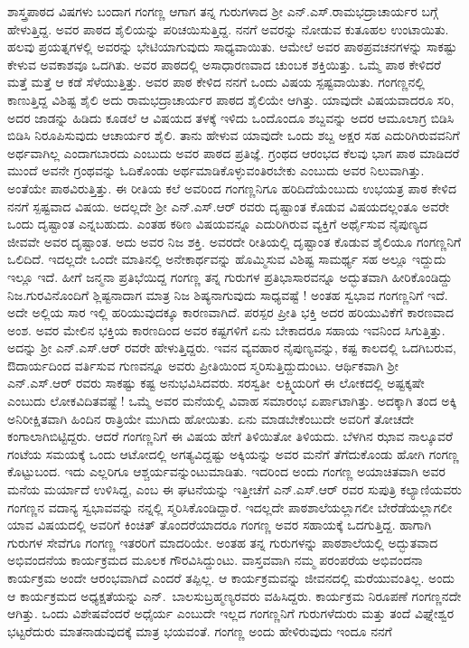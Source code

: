 {ಶಾಸ್ತ್ರಪಾಠದ ವಿಷಗಳು ಬಂದಾಗ ಗಂಗಣ್ಣ ಆಗಾಗ ತನ್ನ ಗುರುಗಳಾದ ಶ್ರೀ ಎನ್.ಎಸ್.ರಾಮಭದ್ರಾಚಾರ್ಯರ ಬಗ್ಗೆ  ಹೇಳುತ್ತಿದ್ದ. ಅವರ ಪಾಠದ \hbox{ಶೈಲಿಯನ್ನು} ಪರಿಚಯಿಸುತ್ತಿದ್ದ. ನನಗೆ ಅವರನ್ನು ನೋಡುವ ಕುತೂಹಲ ಉಂಟಾಯಿತು. ಹಲವು \hbox{ಪ್ರಯತ್ನಗಳಲ್ಲಿ} ಅವರನ್ನು  ಭೇಟಿಯಾಗುವುದು ಸಾಧ್ಯವಾಯಿತು. ಆಮೇಲೆ ಅವರ ಪಾಠಪ್ರವಚನಗಳನ್ನು ಸಾಕಷ್ಟು ಕೇಳುವ ಅವಕಾಶವೂ ಒದಗಿತು. ಅವರ ಪಾಠದಲ್ಲಿ ಅಸಾಧಾರಣವಾದ ಚುಂಬಕ ಶಕ್ತಿಯಿತ್ತು. ಒಮ್ಮೆ ಪಾಠ ಕೇಳಿದರೆ ಮತ್ತೆ ಮತ್ತೆ ಆ ಕಡೆ ಸೆಳೆಯುತ್ತಿತ್ತು. ಅವರ ಪಾಠ ಕೇಳಿದ ನನಗೆ ಒಂದು ವಿಷಯ ಸ್ಪಷ್ಟವಾಯಿತು. \hbox{ಗಂಗಣ್ಣನಲ್ಲಿ} ಕಾಣುತ್ತಿದ್ದ ವಿಶಿಷ್ಟ ಶೈಲಿ ಅದು ರಾಮಭದ್ರಾಚಾರ್ಯರ ಪಾಠದ \hbox{ಶೈಲಿಯೇ} ಆಗಿತ್ತು. ಯಾವುದೇ ವಿಷಯವಾದರೂ ಸರಿ, ಅದರ ಜಾಡನ್ನು ಹಿಡಿದು \hbox{ಕೂಡಲೆ} ಆ ವಿಷಯದ ತಳಕ್ಕೆ ಇಳಿದು ಒಂದೊಂದೂ ಶಬ್ದವನ್ನು ಅದರ ಆಮೂಲಾಗ್ರ ಬಿಡಿಸಿ ಬಿಡಿಸಿ ನಿರೂಪಿಸುವುದು ಆಚಾರ್ಯರ ಶೈಲಿ. ತಾನು ಹೇಳುವ ಯಾವುದೇ ಒಂದು ಶಬ್ದ ಅಕ್ಷರ ಸಹ ಎದುರಿಗಿರುವವನಿಗೆ ಅರ್ಥವಾಗಿಲ್ಲ ಎಂದಾಗಬಾರದು ಎಂಬುದು ಅವರ ಪಾಠದ \hbox{ಪ್ರತಿಜ್ಞೆ.} ಗ್ರಂಥದ ಆರಂಭದ ಕೆಲವು ಭಾಗ ಪಾಠ ಮಾಡಿದರೆ ಮುಂದೆ ಅವನೇ ಗ್ರಂಥವನ್ನು ಓದಿಕೊಂಡು ಅರ್ಥಮಾಡಿಕೊಳ್ಳುವಂತಿರಬೇಕು ಎಂಬುದು ಅವರ ನಿಲುವಾಗಿತ್ತು. ಅಂತೆಯೇ ಪಾಠವಿರುತ್ತಿತ್ತು. ಈ ರೀತಿಯ ಕಲೆ ಅವರಿಂದ ಗಂಗಣ್ಣನಿಗೂ ಹರಿದಿದೆಯೆಂಬುದು ಉಭಯತ್ರ ಪಾಠ ಕೇಳಿದ ನನಗೆ ಸ್ಪಷ್ಟವಾದ ವಿಷಯ. ಅದಲ್ಲದೇ ಶ್ರೀ ಎನ್.ಎಸ್.ಆರ್ ರವರು ದೃಷ್ಟಾಂತ ಕೊಡುವ \hbox{ವಿಷಯದಲ್ಲಂತೂ} ಅವರೇ ಒಂದು ದೃಷ್ಟಾಂತ ಎನ್ನಬಹುದು. ಎಂತಹ ಕಠಿಣ ವಿಷಯ\-ವನ್ನೂ ಎದುರಿಗಿರುವ ವ್ಯಕ್ತಿಗೆ ಅರ್ಥೈಸುವ ನೈಪುಣ್ಯದ ಜೀವವೇ ಅವರ ದೃಷ್ಟಾಂತ. ಅದು ಅವರ ನಿಜ ಶಕ್ತಿ. ಅವರದೇ ರೀತಿಯಲ್ಲಿ ದೃಷ್ಟಾಂತ ಕೊಡುವ ಶೈಲಿಯೂ ಗಂಗಣ್ಣನಿಗೆ ಒಲಿದಿದೆ. ಇದಲ್ಲದೇ ಒಂದೇ ಮಾತಿನಲ್ಲಿ ಅನೇಕಾರ್ಥವನ್ನು ಹೊಮ್ಮಿಸುವ ವಿಶಿಷ್ಟ ಸಾಮರ್ಥ್ಯ ಸಹ ಅಲ್ಲೂ ಇದ್ದುದು ಇಲ್ಲೂ ಇದೆ. ಹೀಗೆ ಜನ್ಮನಾ ಪ್ರತಿಭೆ\-ಯಿದ್ದ ಗಂಗಣ್ಣ ತನ್ನ ಗುರುಗಳ ಪ್ರತಿಭಾಸಾರವನ್ನೂ  ಅದ್ಭುತವಾಗಿ ಹೀರಿಕೊಂಡಿದ್ದು ನಿಜ.\break ಗುರವಿನೊಂದಿಗೆ ಶ್ಲಿಷ್ಟನಾದಾಗ ಮಾತ್ರ ನಿಜ ಶಿಷ್ಯನಾಗುವುದು ಸಾಧ್ಯವಷ್ಟೆ ! ಅಂತಹ ಸ್ವಭಾವ ಗಂಗಣ್ಣನಿಗೆ ಇದೆ. ಅದೇ ಅಲ್ಲಿಯ ಸಾರ ಇಲ್ಲಿ ಹರಿಯುವುದಕ್ಕೂ ಕಾರಣ\-ವಾಗಿದೆ. ಪರಸ್ಪರ ಪ್ರೀತಿ \enginline{-} ಭಕ್ತಿ ಅದರ ಹರಿಯುವಿಕೆಗೆ ಕಾರಣವಾದ ಅಂಶ. ಅವರ ಮೇಲಿನ ಭಕ್ತಿಯ ಕಾರಣದಿಂದ ಅವರ ಕಷ್ಟಗಳಿಗೆ ಏನು ಬೇಕಾದರೂ ಸಹಾಯ ಇವನಿಂದ ಸಿಗುತ್ತಿತ್ತು. ಅದನ್ನು ಶ್ರೀ ಎನ್.ಎಸ್.ಆರ್ ರವರೇ ಹೇಳುತ್ತಿದ್ದರು. ಇವನ ವ್ಯವಹಾರ ನೈಪುಣ್ಯವನ್ನು, ಕಷ್ಟ ಕಾಲದಲ್ಲಿ ಒದಗಿಬರುವ, ಔದಾರ್ಯದಿಂದ ವರ್ತಿಸುವ ಗುಣ\-ವನ್ನೂ ಅವರು ಪ್ರೀತಿಯಿಂದ ಸ್ಮರಿಸುತ್ತಿದ್ದುದುಂಟು. ಆರ್ಥಿಕವಾಗಿ ಶ್ರೀ ಎನ್.ಎಸ್.ಆರ್ ರವರು ಸಾಕಷ್ಟು ಕಷ್ಟ ಅನುಭವಿಸಿದವರು. \hbox{ಸರಸ್ವತೀ ಲಕ್ಷ್ಮಿಯರಿಗೆ} ಈ ಲೋಕದಲ್ಲಿ ಅಷ್ಟಕ್ಕಷೇ ಎಂಬುದು ಲೋಕವಿದಿತವಷ್ಟೆ ! ಒಮ್ಮೆ ಅವರ \hbox{ಮನೆಯಲ್ಲಿ} ವಿವಾಹ ಸಮಾರಂಭ ಏರ್ಪಾಟಾಗಿತ್ತು. ಅದಕ್ಕಾಗಿ ತಂದ ಅಕ್ಕಿ ಅನಿರೀಕ್ಷಿತವಾಗಿ ಹಿಂದಿನ ರಾತ್ರಿಯೇ ಮುಗಿದು ಹೋಯಿತು. ಏನು ಮಾಡಬೇಕೆಂಬುದೇ \hbox{ಅವರಿಗೆ} \hbox{ತೋಚದೇ} \hbox{ಕಂಗಾಲಾಗಿಬಿಟ್ಟಿದ್ದರು.} ಆದರೆ ಗಂಗಣ್ಣನಿಗೆ ಈ ವಿಷಯ ಹೇಗೆ \hbox{ತಿಳಿಯಿತೋ} \hbox{ತಿಳಿಯದು.} ಬೆಳಗಿನ ಝಾವ ನಾಲ್ಕೂವರೆ ಗಂಟೆಯ ಸಮಯಕ್ಕೆ ಒಂದು \hbox{ಆಟೋದಲ್ಲಿ} \hbox{ಅಗತ್ಯವಿದ್ದಷ್ಟು}  ಅಕ್ಕಿಯನ್ನು ಅವರ ಮನೆಗೆ ತೆಗೆದುಕೊಂಡು ಹೋಗಿ ಗಂಗಣ್ಣ \hbox{ಕೊಟ್ಟುಬಂದ.} ಇದು ಎಲ್ಲರಿಗೂ ಆಶ್ಚರ್ಯವನ್ನುಂಟುಮಾಡಿತು. ಇದರಿಂದ ಅಂದು ಗಂಗಣ್ಣ ಅಯಾಚಿತ\-ವಾಗಿ ಅವರ ಮನೆಯ ಮರ್ಯಾದೆ \hbox{ಉಳಿಸಿದ್ದ,} ಎಂಬ ಈ ಘಟನೆಯನ್ನು ಇತ್ತೀಚೆಗೆ ಎನ್.ಎಸ್.ಆರ್ ರವರ ಸುಪುತ್ರಿ ಕಲ್ಯಾಣಿ\-ಯವರು \hbox{ಗಂಗಣ್ಣನ} ವದಾನ್ಯ  ಸ್ವಭಾವವನ್ನು ನನ್ನಲ್ಲಿ ಸ್ಮರಿಸಿಕೊಂಡಿದ್ದಾರೆ. ಇದಲ್ಲದೇ ಪಾಠಶಾಲೆ\-ಯಲ್ಲಾಗಲೀ ಬೇರೆಡೆಯಲ್ಲಾಗಲೀ ಯಾವ ವಿಷಯದಲ್ಲಿ ಅವರಿಗೆ ಕಿಂಚಿತ್ \hbox{ತೊಂದರೆಯಾದರೂ} ಗಂಗಣ್ಣ ಅವರ ಸಹಾಯಕ್ಕೆ ಒದಗುತ್ತಿದ್ದ. ಹಾಗಾಗಿ ಗುರುಗಳ ಸೇವೆಗೂ ಗಂಗಣ್ಣ \hbox{ಇತರರಿಗೆ} \hbox{ಮಾದರಿಯೇ.} ಅಂತಹ ತನ್ನ ಗುರುಗಳನ್ನು ಪಾಠಶಾಲೆ\-ಯಲ್ಲಿ ಅದ್ಭುತವಾದ \hbox{ಅಭಿವಂದನೆಯ} ಕಾರ್ಯಕ್ರಮದ ಮೂಲಕ \hbox{ಗೌರವಿಸಿದ್ದುಂಟು.} ವಾಸ್ತವವಾಗಿ ನಮ್ಮ ಪರಂಪರೆಯ \hbox{ಅಭಿವಂದನಾ} ಕಾರ್ಯಕ್ರಮ ಅಂದೇ ಆರಂಭವಾಗಿದೆ ಎಂದರೆ ತಪ್ಪಿಲ್ಲ. ಆ ಕಾರ್ಯಕ್ರಮವನ್ನು ಜೀವನದಲ್ಲಿ ಮರೆಯುವಂತಿಲ್ಲ. ಅಂದು ಆ ಕಾರ್ಯಕ್ರಮದ ಅಧ್ಯಕ್ಷತೆಯನ್ನು \hbox{ಎನ್. ಬಾಲಸುಬ್ರಹ್ಮಣ್ಯರವರು} ವಹಿಸಿದ್ದರು. ಕಾರ್ಯಕ್ರಮ ನಿರೂಪಣೆ ಗಂಗಣ್ಣನದೇ ಆಗಿತ್ತು. ಒಂದು ವಿಶೇಷವೆಂದರೆ ಅಧೈರ್ಯ ಎಂಬುದೇ ಇಲ್ಲದ ಗಂಗಣ್ಣನಿಗೆ ಗುರುಗಳೆದುರು ಮತ್ತು ತಂದೆ \hbox{ವಿಘ್ನೇಶ್ವರ} ಭಟ್ಟರೆದುರು ಮಾತನಾಡುವುದಕ್ಕೆ ಮಾತ್ರ ಭಯವಂತೆ. ಗಂಗಣ್ಣ ಅಂದು ಹೇಳಿರುವುದು ಇಂದೂ ನನಗೆ }
